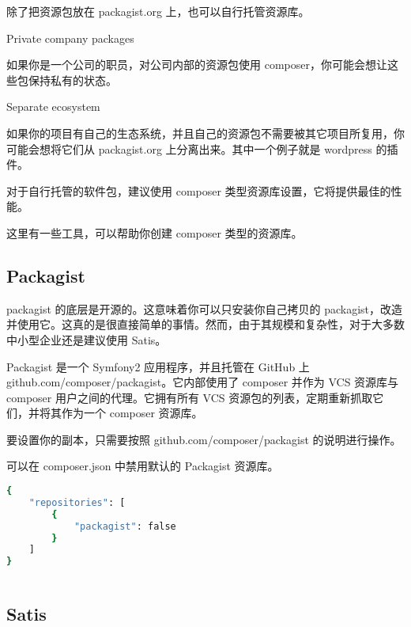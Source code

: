 除了把资源包放在 packagist.org 上，也可以自行托管资源库。

\begin{compactitem}
\item Private company packages

如果你是一个公司的职员，对公司内部的资源包使用 composer，你可能会想让这些包保持私有的状态。

\item Separate ecosystem

如果你的项目有自己的生态系统，并且自己的资源包不需要被其它项目所复用，你可能会想将它们从 packagist.org 上分离出来。其中一个例子就是 wordpress 的插件。
\end{compactitem}


对于自行托管的软件包，建议使用 composer 类型资源库设置，它将提供最佳的性能。

这里有一些工具，可以帮助你创建 composer 类型的资源库。

\subsection{Packagist}

packagist 的底层是开源的。这意味着你可以只安装你自己拷贝的 packagist，改造并使用它。这真的是很直接简单的事情。然而，由于其规模和复杂性，对于大多数中小型企业还是建议使用 Satis。

Packagist 是一个 Symfony2 应用程序，并且托管在 GitHub 上 github.com/composer/packagist。它内部使用了 composer 并作为 VCS 资源库与 composer 用户之间的代理。它拥有所有 VCS 资源包的列表，定期重新抓取它们，并将其作为一个 composer 资源库。

要设置你的副本，只需要按照 github.com/composer/packagist 的说明进行操作。

可以在 composer.json 中禁用默认的 Packagist 资源库。

\begin{lstlisting}[language=bash]
{
    "repositories": [
        {
            "packagist": false
        }
    ]
}
\end{lstlisting}






\begin{lstlisting}[language=bash]

\end{lstlisting}

\subsection{Satis}

